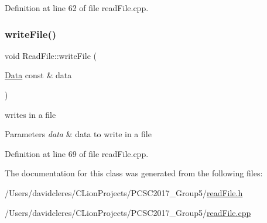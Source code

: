 Definition at line 62 of file read\+File.\+cpp.

\mbox{\label{class_read_file_ac11779a3630a2c1d62ab4566abb4034a}} 
\subsubsection{\texorpdfstring{write\+File()}{writeFile()}}
{\footnotesize\ttfamily void Read\+File\+::write\+File (\begin{DoxyParamCaption}\item[{\mbox{\hyperlink{struct_data}{Data}} const \&}]{data }\end{DoxyParamCaption})}



writes in a file 


\begin{DoxyParams}{Parameters}
{\em data} & data to write in a file \\
\hline
\end{DoxyParams}


Definition at line 69 of file read\+File.\+cpp.



The documentation for this class was generated from the following files\+:\begin{DoxyCompactItemize}
\item 
/\+Users/davidcleres/\+C\+Lion\+Projects/\+P\+C\+S\+C2017\+\_\+\+Group5/\mbox{\hyperlink{read_file_8h}{read\+File.\+h}}\item 
/\+Users/davidcleres/\+C\+Lion\+Projects/\+P\+C\+S\+C2017\+\_\+\+Group5/\mbox{\hyperlink{read_file_8cpp}{read\+File.\+cpp}}\end{DoxyCompactItemize}
